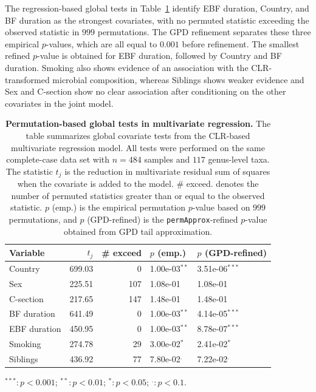 The regression-based global tests in Table~\ref{tab:7app:regression:global-tests} identify EBF duration, Country, and BF duration as the strongest covariates, with no permuted statistic exceeding the observed statistic in $999$ permutations. The GPD refinement separates these three empirical $p$-values, which are all equal to $0.001$ before refinement. The smallest refined $p$-value is obtained for EBF duration, followed by Country and BF duration. Smoking also shows evidence of an association with the CLR-transformed microbial composition, whereas Siblings shows weaker evidence and Sex and C-section show no clear association after conditioning on the other covariates in the joint model.

\begin{table}[H]
\centering
\caption{\textbf{Permutation-based global tests in multivariate regression.} The table summarizes global covariate tests from the CLR-based multivariate regression model. All tests were performed on the same complete-case data set with $n=484$ samples and $117$ genus-level taxa. The statistic $t_j$ is the reduction in multivariate residual sum of squares when the covariate is added to the model. \# exceed. denotes the number of permuted statistics greater than or equal to the observed statistic. $p$ (emp.) is the empirical permutation $p$-value based on $999$ permutations, and $p$ (GPD-refined) is the \texttt{permApprox}-refined $p$-value obtained from GPD tail approximation.}
\label{tab:7app:regression:global-tests}
\centering
\begin{threeparttable}
\begin{tabular}[t]{lrrll}
\toprule
Variable & $t_j$ & \# exceed & $p$ (emp.) & $p$ (GPD-refined)\\
\midrule
Country & 699.03 & 0 & 1.00e-03$^{**}$ & 3.51e-06$^{***}$\\
Sex & 225.51 & 107 & 1.08e-01 & 1.08e-01\\
C-section & 217.65 & 147 & 1.48e-01 & 1.48e-01\\
BF duration & 641.49 & 0 & 1.00e-03$^{**}$ & 4.14e-05$^{***}$\\
EBF duration & 450.95 & 0 & 1.00e-03$^{**}$ & 8.78e-07$^{***}$\\
Smoking & 274.78 & 29 & 3.00e-02$^{*}$ & 2.41e-02$^{*}$\\
Siblings & 436.92 & 77 & 7.80e-02$^{.}$ & 7.22e-02$^{.}$\\
\bottomrule
\end{tabular}
\begin{tablenotes}
\item $^{***}:p<0.001$; $^{**}:p<0.01$; $^{*}:p<0.05$; $^{.}:p<0.1$.
\end{tablenotes}
\end{threeparttable}
\end{table}

